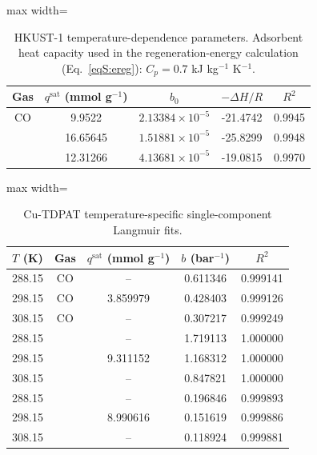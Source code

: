 \documentclass[11pt,a4paper]{article}
\newcommand{\COtwo}{\ce{CO2}}
\newcommand{\CHfour}{\ce{CH4}}
\begin{document}
\begin{table}[htbp]
\centering
\caption{HKUST-1 temperature-dependence parameters. Adsorbent heat capacity
used in the regeneration-energy calculation (Eq.~\eqref{eqS:ereg}):
$C_p = 0.7$ kJ kg$^{-1}$ K$^{-1}$.}
\label{tabS:hkustarr}
\small
\begin{adjustbox}{max width=\textwidth}
\begin{tabular}{ccccc}
\toprule
Gas & $q^{\mathrm{sat}}$ (mmol g$^{-1}$) & $b_0$ & $-\Delta H/R$ & $R^2$ \\
\midrule
CO & 9.9522 & $2.13384\times10^{-5}$ & -21.4742 & 0.9945 \\
\COtwo{} & 16.65645 & $1.51881\times10^{-5}$ & -25.8299 & 0.9948 \\
\CHfour{} & 12.31266 & $4.13681\times10^{-5}$ & -19.0815 & 0.9970 \\
\bottomrule
\end{tabular}
\end{adjustbox}
\end{table}

\begin{table}[htbp]
\centering
\caption{Cu-TDPAT temperature-specific single-component Langmuir fits.}
\label{tabS:cutdpatfit}
\small
\begin{adjustbox}{max width=\textwidth}
\begin{tabular}{ccccc}
\toprule
$T$ (K) & Gas & $q^{\mathrm{sat}}$ (mmol g$^{-1}$) & $b$ (bar$^{-1}$) & $R^2$ \\
\midrule
288.15 & CO & -- & 0.611346 & 0.999141 \\
298.15 & CO & 3.859979 & 0.428403 & 0.999126 \\
308.15 & CO & -- & 0.307217 & 0.999249 \\
288.15 & \COtwo{} & -- & 1.719113 & 1.000000 \\
298.15 & \COtwo{} & 9.311152 & 1.168312 & 1.000000 \\
308.15 & \COtwo{} & -- & 0.847821 & 1.000000 \\
288.15 & \CHfour{} & -- & 0.196846 & 0.999893 \\
298.15 & \CHfour{} & 8.990616 & 0.151619 & 0.999886 \\
308.15 & \CHfour{} & -- & 0.118924 & 0.999881 \\
\bottomrule
\end{tabular}
\end{adjustbox}
\end{table}
\end{document}
